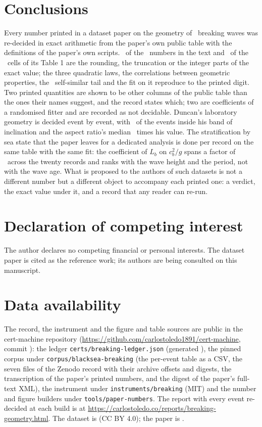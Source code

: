 \documentclass[preprint,11pt,authoryear]{elsarticle}
\begin{document}
\section{Conclusions}\label{sec:conclusions}
Every number printed in a dataset paper on the geometry of \NEvents\ breaking waves was re-decided in exact arithmetic from the paper's own public table with the definitions of the paper's own scripts. \ItemsRoundingOrTruncation\ of the \ItemsTotal\ numbers in the text and \TOneReproduced\ of the \TOneCells\ cells of its Table 1 are the rounding, the truncation or the integer parts of the exact value; the three quadratic laws, the correlations between geometric properties, the \SelfSimPrinted\ self-similar tail and the fit on it reproduce to the printed digit. Two printed quantities are shown to be other columns of the public table than the ones their names suggest, and the record states which; two are coefficients of a randomised fitter and are recorded as not decidable. Duncan's laboratory geometry is decided event by event, with \AngleInsidePct\ of the events inside his band of inclination and the aspect ratio's median \AspectMedianOverDuncan\ times his value. The stratification by sea state that the paper leaves for a dedicated analysis is done per record on the same table with the same fit: the coefficient of $L_b$ on $c_b^2/g$ spans a factor of \SlopeSpread\ across the twenty records and ranks with the wave height and the period, not with the wave age. What is proposed to the authors of such datasets is not a different number but a different object to accompany each printed one: a verdict, the exact value under it, and a record that any reader can re-run.

\section*{Declaration of competing interest}
The author declares no competing financial or personal interests. The dataset paper is cited as the reference work; its authors are being consulted on this manuscript.

\section*{Data availability}
The record, the instrument and the figure and table sources are public in the cert-machine repository (\url{https://github.com/carlostoledo1891/cert-machine}, commit \RepoCommit): the ledger \texttt{certs/breaking-ledger.json} (generated \LedgerGenerated), the pinned corpus under \texttt{corpus/blacksea-breaking} (the per-event table as a CSV, the seven files of the Zenodo record with their archive offsets and digests, the transcription of the paper's printed numbers, and the digest of the paper's full-text XML), the instrument under \texttt{instruments/breaking} (MIT) and the number and figure builders under \texttt{tools/paper-numbers}. The report with every event re-decided at each build is at \url{https://carlostoledo.co/reports/breaking-geometry.html}. The dataset is \citet{zenodo2026} (CC BY 4.0); the paper is \citet{guimaraes2026}.
\end{document}
